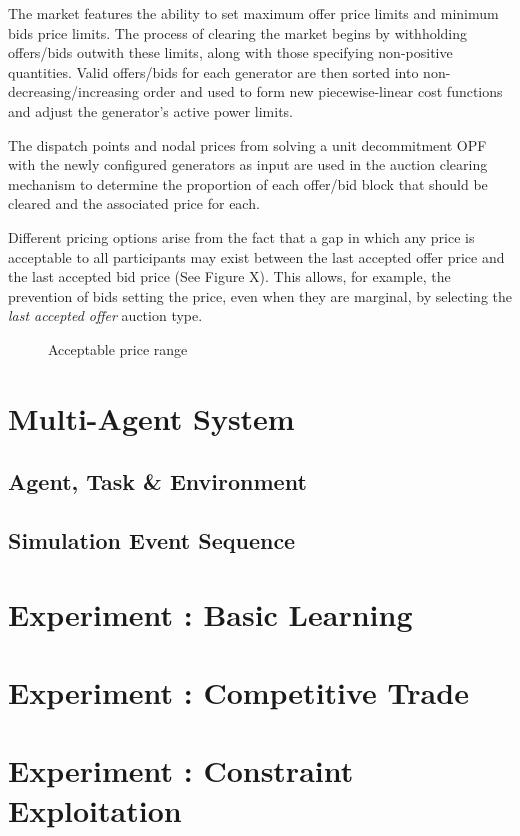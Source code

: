 The market features the ability to set maximum offer price limits and minimum
bids price limits.  The process of clearing the market begins by withholding
offers/bids outwith these limits, along with those specifying non-positive
quantities.  Valid offers/bids for each generator are then sorted into
non-decreasing/increasing order and used to form new piecewise-linear cost
functions and adjust the generator's active power limits.

The dispatch points and nodal prices from solving a unit decommitment OPF with
the newly configured generators as input are used in the auction clearing
mechanism to determine the proportion of each offer/bid block that should be
cleared and the associated price for each.

Different pricing options arise from the fact that a gap in which any price is
acceptable to all participants may exist between the last accepted offer price
and the last accepted bid price (See Figure X).  This allows, for example,
the prevention of bids setting the price, even when they are marginal, by
selecting the \textit{last accepted offer} auction type.

\begin{figure}
\label{fig:aution_types}
\centering
{}
\caption{Acceptable price range}
\end{figure}

\section{Multi-Agent System}
\label{sec:mas}

\subsection{Agent, Task \& Environment}

\subsection{Simulation Event Sequence}

\section{Experiment : Basic Learning}
\section{Experiment : Competitive Trade}
\section{Experiment : Constraint Exploitation}
